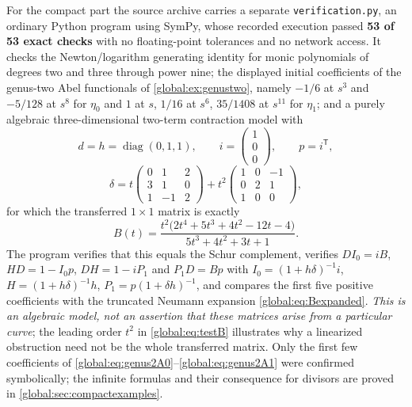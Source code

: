 \documentclass[11pt,letterpaper]{article}
\theoremstyle{definition}
\theoremstyle{remark}
\numberwithin{equation}{section}
\begin{document}
For the compact part the source archive carries a separate \texttt{verification.py}, an ordinary Python program using SymPy, whose recorded execution passed \textbf{53 of 53 exact checks} with no floating-point tolerances and no network access. It checks the Newton/logarithm generating identity for monic polynomials of degrees two and three through power nine; the displayed initial coefficients of the genus-two Abel functionals of \cref{global:ex:genustwo}, namely $-1/6$ at $s^3$ and $-5/128$ at $s^8$ for $\eta_0$ and $1$ at $s$, $1/16$ at $s^6$, $35/1408$ at $s^{11}$ for $\eta_1$; and a purely algebraic three-dimensional two-term contraction model with
\[
  d=h=\operatorname{diag}(0,1,1),\qquad
  i=\begin{pmatrix}1\\0\\0\end{pmatrix},\qquad p=i^{\mathsf T},
\]
\[
  \delta=t\begin{pmatrix}0&1&2\\3&1&0\\1&-1&2\end{pmatrix}
       +t^2\begin{pmatrix}1&0&-1\\0&2&1\\1&0&0\end{pmatrix},
\]
for which the transferred $1\times1$ matrix is exactly
\begin{equation}\label{global:eq:testB}
  B(t)=\frac{t^2\bigl(2t^4+5t^3+4t^2-12t-4\bigr)}{5t^3+4t^2+3t+1}.
\end{equation}
The program verifies that this equals the Schur complement, verifies $DI_0=iB$, $HD=1-I_0p$, $DH=1-iP_1$ and $P_1D=Bp$ with $I_0=(1+h\delta)^{-1}i$, $H=(1+h\delta)^{-1}h$, $P_1=p(1+\delta h)^{-1}$, and compares the first five positive coefficients with the truncated Neumann expansion \eqref{global:eq:Bexpanded}. \emph{This is an algebraic model, not an assertion that these matrices arise from a particular curve}; the leading order $t^2$ in \eqref{global:eq:testB} illustrates why a linearized obstruction need not be the whole transferred matrix. Only the first few coefficients of \eqref{global:eq:genus2A0}--\eqref{global:eq:genus2A1} were confirmed symbolically; the infinite formulas and their consequence for divisors are proved in \cref{global:sec:compactexamples}.
\end{document}
